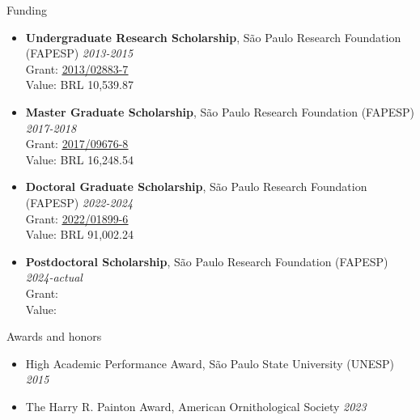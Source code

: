 \documentclass{resume}
\begin{document}

\begin{rSection}{Funding} 
\begin{itemize}
\item {\bf Undergraduate Research Scholarship}{, São Paulo Research Foundation (FAPESP)
} \hfill{\em 2013-2015}\\
Grant: \href{https://bv.fapesp.br/en/bolsas/142421/effect-of-fragmentation-on-the-persistence-of-anuran-amphibians-amphibia-anura-within-the-atlanti/}{\underline{2013/02883-7}}\\
Value: BRL 10,539.87

\item {\bf Master Graduate Scholarship}{, São Paulo Research Foundation (FAPESP)
} \hfill{\em 2017-2018}\\
Grant: \href{https://bv.fapesp.br/en/bolsas/172826/effect-of-landscape-modifications-and-climate-changes-on-the-persistence-of-amphibians-in-the-atlant/}{\underline{2017/09676-8}}\\
Value: BRL 16,248.54

\item {\bf Doctoral Graduate Scholarship}{, São Paulo Research Foundation (FAPESP)
} \hfill{\em 2022-2024}\\
Grant: \href{https://bv.fapesp.br/en/bolsas/203713/landscape-structure-as-a-predictor-of-taxonomic-and-functional-diversity-of-amphibians-in-the-atlant/}{\underline{2022/01899-6}}\\
Value: BRL 91,002.24

\item {\bf Postdoctoral Scholarship}{, São Paulo Research Foundation (FAPESP)
} \hfill{\em 2024-actual}\\
Grant: \\
Value: 
\end{itemize}
\end{rSection}


\begin{rSection}{Awards and honors} 
\begin{itemize}
\item {High Academic Performance Award, São Paulo State University (UNESP)} \hfill{\em 2015}
\item {The Harry R. Painton Award, American Ornithological Society} \hfill{\em 2023}
\end{itemize}
\end{rSection}
\end{document}
